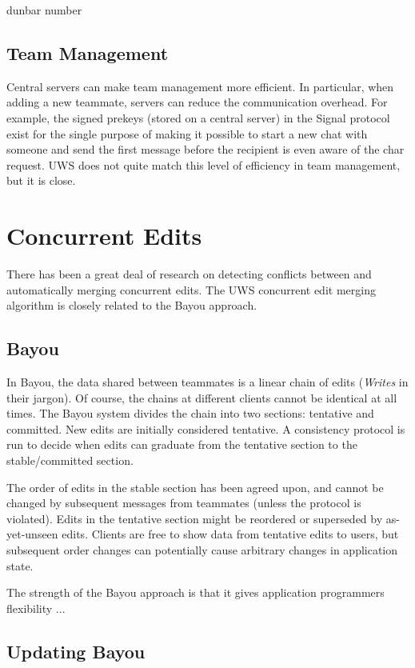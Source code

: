 \documentclass{article}
\begin{document}
dunbar number

\subsection{Team Management}

Central servers can make team management more efficient.
In particular, when adding a new teammate, servers can reduce the communication overhead.
For example, the signed prekeys (stored on a central server) in the Signal protocol exist for the single purpose of making it possible to start a new chat with someone and send the first message before the recipient is even aware of the char request.
UWS does not quite match this level of efficiency in team management, but it is close.

\section{Concurrent Edits}

There has been a great deal of research on detecting conflicts between and automatically merging concurrent edits.
The UWS concurrent edit merging algorithm is closely related to the Bayou approach.

\subsection{Bayou}

In Bayou, the data shared between teammates is a linear chain of edits (\emph{Writes} in their jargon).
Of course, the chains at different clients cannot be identical at all times.
The Bayou system divides the chain into two sections: tentative and committed.
New edits are initially considered tentative.
A consistency protocol is run to decide when edits can graduate from the tentative section to the stable/committed section.

The order of edits in the stable section has been agreed upon, and cannot be changed by subsequent messages from teammates (unless the protocol is violated).
Edits in the tentative section might be reordered or superseded by as-yet-unseen edits.
Clients are free to show data from tentative edits to users, but subsequent order changes can potentially cause arbitrary changes in application state.


The strength of the Bayou approach is that it gives application programmers flexibility ...

\subsection{Updating Bayou}
\end{document}
